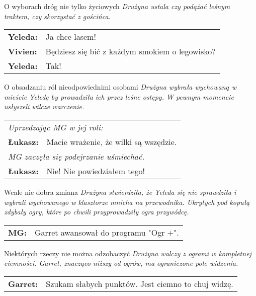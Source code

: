 \documentclass[10pt,twoside,twocolumn]{book}
\begin{document}
\begin{rpg-quotebox}{O wyborach dróg nie tylko życiowych}
   \textit{Drużyna ustala czy podążać leśnym traktem, czy skorzystać z gościńca.}\\
   
   \begin{tabularx}{\columnwidth}{lX}
      \textbf{Yeleda:} & Ja chce lasem!\\
      \textbf{Vivien:} & Będziesz się bić z każdym smokiem o legowisko?\\
      \textbf{Yeleda:} & Tak!\\
   \end{tabularx}
\end{rpg-quotebox}

\begin{rpg-quotebox}{O obsadzaniu ról nieodpowiednimi osobami}
   \textit{Drużyna wybrała wychowaną w mieście Yeledę by prowadziła ich przez leśne ostępy. W pewnym momencie usłyszeli wilcze warczenie.}\\
   
   \begin{tabularx}{\columnwidth}{lX}
      \multicolumn{2}{l}{\textit{Uprzedzając MG w jej roli:}}\\
      \textbf{Łukasz:} & Macie wrażenie, że wilki są wszędzie.\\
      \multicolumn{2}{l}{\textit{MG zaczęła się podejrzanie uśmiechać.}}\\
      \textbf{Łukasz:} & Nie! Nie powiedziałem tego!\\
   \end{tabularx}
\end{rpg-quotebox}

\begin{rpg-quotebox}{Wcale nie dobra zmiana}
   \textit{Drużyna stwierdziła, że Yeleda się nie sprawdziła i wybrali wychowanego w klasztorze mnicha na przewodnika. Ukrytych pod kopułą zdybały ogry, które po chwili przyprowadziły ogra przywódcę.}\\

   \begin{tabularx}{\columnwidth}{lX}
      \textbf{MG:} & Garret awansował do programu "Ogr +".\\
   \end{tabularx}
\end{rpg-quotebox}

\begin{rpg-quotebox}{Niektórych rzeczy nie można odzobaczyć}
   \textit{Drużyna walczy z ogrami w kompletnej ciemności. Garret, znacząco niższy od ogrów, ma ograniczone pole widzenia.}\\

   \begin{tabularx}{\columnwidth}{lX}
      \textbf{Garret:} & Szukam słabych punktów. Jest ciemno to chuj widzę.\\
   \end{tabularx}
\end{rpg-quotebox}
\end{document}
